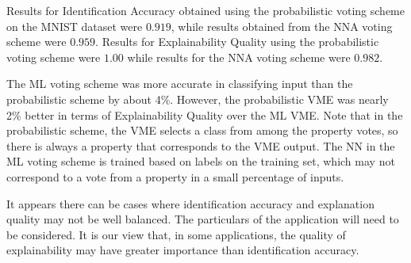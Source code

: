 \documentclass[conference]{IEEEtran}
\begin{document}
Results for Identification Accuracy obtained using the probabilistic voting scheme on the MNIST dataset were $0.919$, while results obtained from the NNA voting scheme were $0.959$.  Results for Explainability Quality using the probabilistic voting scheme were $1.00$ while results for the NNA voting scheme were $0.982$.

The ML voting scheme was more accurate in classifying input than the probabilistic scheme by about 4\%.   However, the probabilistic VME was nearly 2\% better in terms of Explainability Quality over the ML VME.  Note that in the probabilistic scheme, the VME selects a class from among the property votes, so there is always a property that corresponds to the VME output.  The NN in the ML voting scheme is trained based on labels on the training set, which may not correspond to a vote from a property in a small percentage of inputs.

It appears there can be cases where identification accuracy and explanation quality may not be well balanced.  The particulars of the application will need to be considered.  It is our view that, in some applications, the quality of explainability may have greater importance than identification accuracy.


{}
\end{document}

